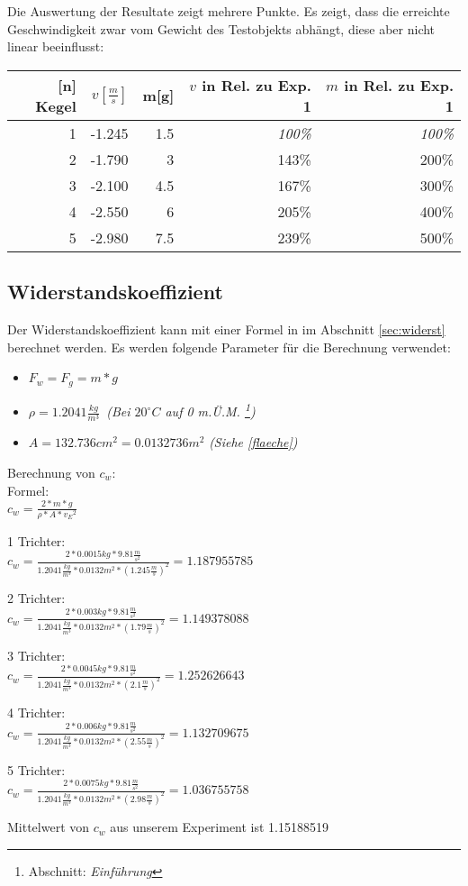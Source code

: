 Die Auswertung der Resultate zeigt mehrere Punkte. Es zeigt, dass die erreichte Geschwindigkeit zwar vom Gewicht des Testobjekts abhängt, diese aber nicht linear beeinflusst:

\begin{tabular}{rrrrr}
	\textbf{[n] Kegel} & \(v[\frac{m}{s}]\) & m[g] & {\small \(v\) in Rel. zu Exp. 1} & {\small \(m\) in Rel. zu Exp. 1} \\ \hline
	1 & -1.245 & 1.5 & \textit{100\%} & \textit{100\%} \\
	2 & -1.790 & 3   & 143\% & 200\% \\
	3 & -2.100 & 4.5 & 167\% & 300\% \\
	4 & -2.550 & 6   & 205\% & 400\% \\
	5 & -2.980 & 7.5 & 239\% & 500\% \\
\end{tabular}

\subsection{Widerstandskoeffizient}

Der Widerstandskoeffizient kann mit einer Formel in im Abschnitt \ref{sec:widerst} berechnet werden. Es werden folgende Parameter für die Berechnung verwendet:
\begin{itemize}
	\item \(F_w = F_g = m * g\)
	\item \(\rho = 1.2041 \frac{kg}{m^{3}} \)\ \textit{(Bei \(20^\circ C \) auf 0 m.Ü.M. \footnote{\cite{wikiluftdichte} Abschnitt: \textit{Einführung}})}
	\item \(A = 132.736 cm^2 = 0.0132736 m^2\) \textit{(Siehe \ref{flaeche})}
\end{itemize}

Berechnung von $ c_w $: \\

Formel: \\
$ c_w = \frac{2 * {m} * {g} }{\rho  * A * {v_E} ^{2}} $

1 Trichter: \\
 $ c_w = \frac{2 * 0.0015kg * 9.81\frac{m}{s^{2}}}{1.2041\frac{kg}{m^3}  * 0.0132 m^2 * (1.245\frac{m}{s})^2} = 1.187955785$

2 Trichter: \\
 $ c_w = \frac{2 * 0.003kg * 9.81\frac{m}{s^{2}}}{1.2041\frac{kg}{m^3}  * 0.0132 m^2 * (1.79\frac{m}{s})^2} = 1.149378088$

3 Trichter: \\
 $ c_w = \frac{2 * 0.0045kg * 9.81\frac{m}{s^{2}}}{1.2041\frac{kg}{m^3}  * 0.0132 m^2 * (2.1\frac{m}{s})^2} = 1.252626643$

4 Trichter: \\
 $ c_w = \frac{2 * 0.006kg * 9.81\frac{m}{s^{2}}}{1.2041\frac{kg}{m^3}  * 0.0132 m^2 * (2.55\frac{m}{s})^2} = 1.132709675$

5 Trichter: \\
 $ c_w = \frac{2 * 0.0075kg * 9.81\frac{m}{s^{2}}}{1.2041\frac{kg}{m^3}  * 0.0132 m^2 * (2.98\frac{m}{s})^2} = 1.036755758$

Mittelwert von $c_w$ aus unserem Experiment ist 1.15188519

